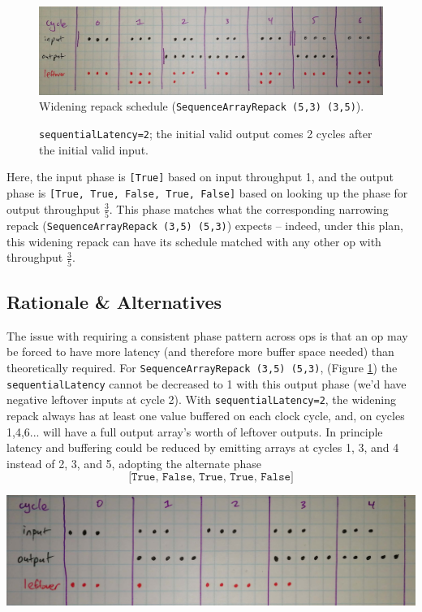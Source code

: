 \documentclass[12pt]{article}
\begin{document}
\begin{figure}[bth]
\includegraphics[width=1.0\linewidth]{Figures/widening.jpg}
Widening repack schedule (\texttt{SequenceArrayRepack (5,3) (3,5)}).

\caption{\texttt{sequentialLatency=2}; the initial valid output comes 2 cycles
after the initial valid input.}
\label{widening.jpg}
\end{figure}

Here, the input phase is \texttt{[True]} based on input throughput 1,
and the output phase is \texttt{[True, True, False, True, False]}
based on looking up the phase for output throughput
$\frac{3}{5}$. This phase matches what the corresponding narrowing
repack (\texttt{SequenceArrayRepack (3,5) (5,3)}) expects -- indeed,
under this plan, this widening repack can have its schedule matched
with any other op with throughput $\frac{3}{5}$.

\subsection{Rationale \& Alternatives}

The issue with requiring a consistent phase pattern across ops is that
an op may be forced to have more latency (and therefore more buffer
space needed) than theoretically required. For
\texttt{SequenceArrayRepack (3,5) (5,3)}, (Figure \ref{widening.jpg})
the \texttt{sequentialLatency} cannot be decreased to 1 with this
output phase (we'd have negative leftover inputs at cycle 2). With
\texttt{sequentialLatency=2}, the widening repack always has at least
one value buffered on each clock cycle, and, on cycles 1,4,6... will
have a full output array's worth of leftover outputs.  In principle
latency and buffering could be reduced by emitting arrays at cycles 1,
3, and 4 instead of 2, 3, and 5, adopting the alternate phase
\begin{equation}
    \texttt{[True, False, True, True, False]} %
    \label{alternate-phase}
\end{equation}

\begin{center}
\includegraphics[width=1.0\linewidth]{Figures/alternate-widening.jpg}
\end{center}
\end{document}
